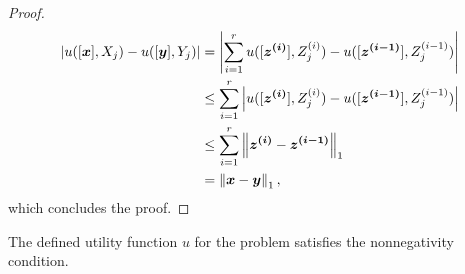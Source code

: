 \begin{proof}
    \begin{align*}
         \left| u([\boldsymbol{x}], X_j) - u([\boldsymbol{y}], Y_j)\right| &=  \left| \sum_{i=1}^r u([\boldsymbol{z^{(i)}}], Z^{(i)}_j) - u([\boldsymbol{z^{(i-1)}}], Z^{(i-1)}_j) \right|\\
         & \leq  \sum_{i=1}^r \left| u([\boldsymbol{z^{(i)}}], Z^{(i)}_j) - u([\boldsymbol{z^{(i-1)}}], Z^{(i-1)}_j) \right|\\
         & \leq \sum_{i=1}^r \left \| {\boldsymbol{z^{(i)}} - \boldsymbol{z^{(i-1)}}} \right\|_{1}\\
         & =  \left \| {\boldsymbol{x} - \boldsymbol{y}} \right\|_{1},
    \end{align*}
    which concludes the proof.
\end{proof}


\begin{claim}\label{clm:majority-nonnegativity-holds}
    The defined utility function $u$ for the \mccs{} problem satisfies the nonnegativity condition.
\end{claim}
